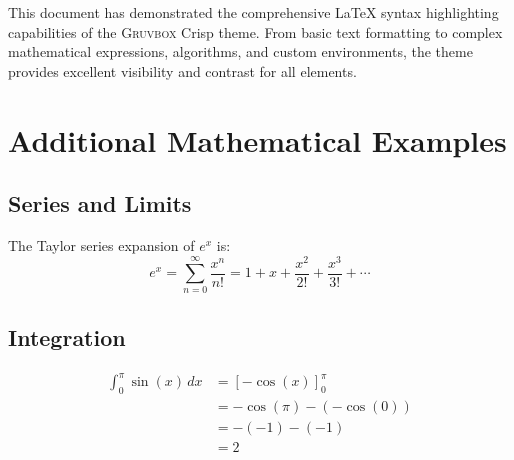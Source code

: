\documentclass[12pt,a4paper]{article}
\newcommand{\gruvbox}{\textsc{Gruvbox}}
\theoremstyle{definition}
\theoremstyle{remark}
\begin{document}
This document has demonstrated the comprehensive \LaTeX{} syntax highlighting capabilities of the \gruvbox{} Crisp theme. From basic text formatting to complex mathematical expressions, algorithms, and custom environments, the theme provides excellent visibility and contrast for all elements.

\appendix

\section{Additional Mathematical Examples}

\subsection{Series and Limits}

The Taylor series expansion of $e^x$ is:
\begin{equation}
    e^x = \sum_{n=0}^{\infty} \frac{x^n}{n!} = 1 + x + \frac{x^2}{2!} + \frac{x^3}{3!} + \cdots
\end{equation}

\subsection{Integration}

\begin{align}
    \int_0^{\pi} \sin(x)\,dx &= [-\cos(x)]_0^{\pi} \\
                              &= -\cos(\pi) - (-\cos(0)) \\
                              &= -(-1) - (-1) \\
                              &= 2
\end{align}



\end{document}
